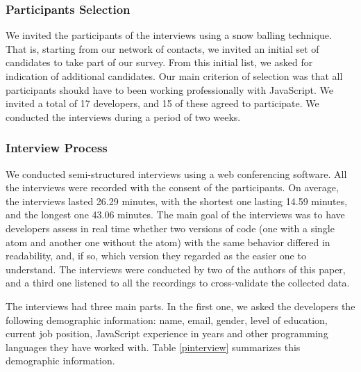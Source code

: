 
\subsubsection{Participants Selection} We invited the participants of the interviews using a snow balling technique. That is, starting from our network of contacts, we invited an initial set of candidates to take part of our survey. From this initial list, we asked for indication of additional candidates. Our main criterion of selection was that all participants shoukd have to been working professionally with JavaScript. We invited a total of 17 developers, and 15 of these agreed to participate. We conducted the interviews during a period of two weeks.


\subsubsection{Interview Process} We conducted semi-structured interviews using a web conferencing software. All the interviews were recorded with the consent of the participants. On average, the interviews lasted 26.29 minutes, with the shortest one lasting 14.59 minutes, and the longest one 43.06 minutes. The main goal of the interviews was to have developers assess in real time whether two versions of code (one with a single atom and another one without the atom) with the same behavior differed in readability, and, if so, which version they regarded as the easier one to understand. The interviews were conducted by two of the authors of this paper, and a third one listened to all the recordings to cross-validate the collected data.


The interviews had three main parts. In the first one, we asked the developers the following demographic information: name, email, gender, level of education, current job position, JavaScript experience in years and other programming languages they have worked with.
Table \ref{pinterview} summarizes this demographic information.


